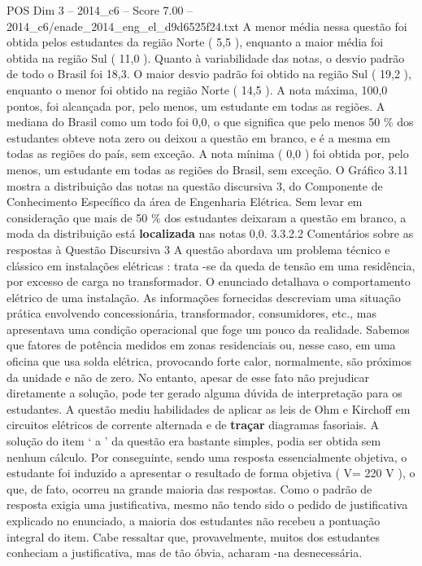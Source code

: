 \begin{textsample}{POS Dim 3 – 2014\_c6 – Score 7.00 – 2014\_c6/enade\_2014\_eng\_el\_d9d6525f24.txt}
A menor média nessa questão foi obtida pelos estudantes da região Norte ( 5,5 ), enquanto a maior média foi obtida na região Sul ( 11,0 ).
Quanto à variabilidade das notas, o desvio padrão de todo o Brasil foi 18,3.
O maior desvio padrão foi obtido na região Sul ( 19,2 ), enquanto o menor foi obtido na região Norte ( 14,5 ).
A nota máxima, 100,0 pontos, foi alcançada por, pelo menos, um estudante em todas as regiões.
A mediana do Brasil como um todo foi 0,0, o que significa que pelo menos 50 \% dos estudantes obteve nota zero ou deixou a questão em branco, e é a mesma em todas as regiões do país, sem exceção.
A nota mínima ( 0,0 ) foi obtida por, pelo menos, um estudante em todas as regiões do Brasil, sem exceção.
O Gráfico 3.11 mostra a distribuição das notas na questão discursiva 3, do Componente de Conhecimento Específico da área de Engenharia Elétrica.
Sem levar em consideração que mais de 50 \% dos estudantes deixaram a questão em branco, a moda da distribuição está \textbf{localizada} nas notas 0,0. 3.3.2.2 Comentários sobre as respostas à Questão Discursiva 3 A questão abordava um problema técnico e clássico em instalações elétricas : trata -se da queda de tensão em uma residência, por excesso de carga no transformador.
O enunciado detalhava o comportamento elétrico de uma instalação.
As informações fornecidas descreviam uma situação prática envolvendo concessionária, transformador, consumidores, etc., mas apresentava uma condição operacional que foge um pouco da realidade.
Sabemos que fatores de potência medidos em zonas residenciais ou, nesse caso, em uma oficina que usa solda elétrica, provocando forte calor, normalmente, são próximos da unidade e não de zero.
No entanto, apesar de esse fato não prejudicar diretamente a solução, pode ter gerado alguma dúvida de interpretação para os estudantes.
A questão mediu habilidades de aplicar as leis de Ohm e Kirchoff em circuitos elétricos de corrente alternada e de \textbf{traçar} diagramas fasoriais.
A solução do item ‘ a ’ da questão era bastante simples, podia ser obtida sem nenhum cálculo.
Por conseguinte, sendo uma resposta essencialmente objetiva, o estudante foi induzido a apresentar o resultado de forma objetiva ( V= 220 V ), o que, de fato, ocorreu na grande maioria das respostas.
Como o padrão de resposta exigia uma justificativa, mesmo não tendo sido o pedido de justificativa explicado no enunciado, a maioria dos estudantes não recebeu a pontuação integral do item.
Cabe ressaltar que, provavelmente, muitos dos estudantes conheciam a justificativa, mas de tão óbvia, acharam -na desnecessária.

\end{textsample}
